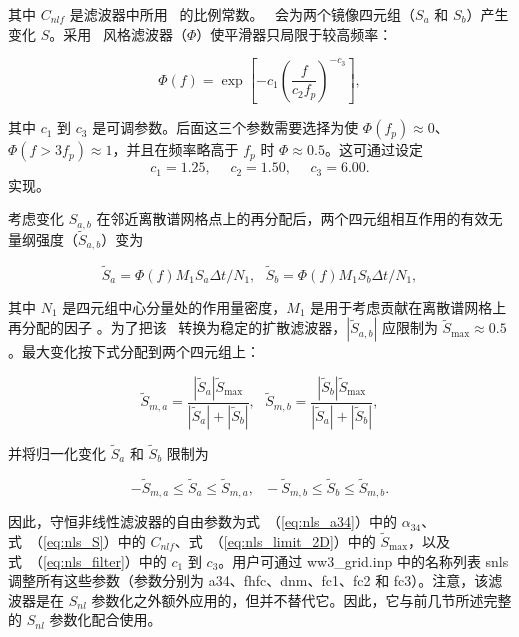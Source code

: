 \noindent 
其中 $C_{nlf}$ 是滤波器中所用 \dia\ 的比例常数。 \dia\ 会为两个镜像四元组（$S_a$ 和 $S_b$）产生变化 $S$。采用 \js\ 风格滤波器（$\Phi$）使平滑器只局限于较高频率：


\begin{equation}
\Phi(f) = \exp \left [ -c_1 \left ( \frac{f}{c_2 f_p} \right ) ^ {-c_3}
               \right ] ,
\label{eq:nls_filter}
\end{equation}

\noindent
其中 $c_1$ 到 $c_3$ 是可调参数。后面这三个参数需要选择为使 $\Phi(f_p) \approx 0$、$\Phi(f > 3f_p) \approx 1$，并且在频率略高于 $f_p$ 时 $\Phi \approx 0.5$。这可通过设定
\begin{equation}
c_1 = 1.25, \:\:\:  \:\:\: c_2 = 1.50, \:\:\:  \:\:\: c_3 = 6.00. 
\label{eq:nls_f_parms}
\end{equation}
实现。

 
考虑变化 $S_{a,b}$ 在邻近离散谱网格点上的再分配后，两个四元组相互作用的有效无量纲强度（$\tilde{S}_{a,b}$）变为

\begin{equation}
\tilde{S}_a = \Phi(f) M_1 S_a \Delta t / N_1
, \:\:\:
\tilde{S}_b = \Phi(f) M_1 S_b \Delta t / N_1
, \label{eq:nls_tilde_s}
\end{equation}

\noindent 
其中 $N_1$ 是四元组中心分量处的作用量密度，$M_1$ 是用于考虑贡献在离散谱网格上再分配的因子 \citep[详见][]{tol:OMOD11}。为了把该 \dia\ 转换为稳定的扩散滤波器，$|\tilde{S}_{a,b}|$ 应限制为 $\tilde{S}_{\max} \approx 0.5$ \citep[例如][]{bk:Fle88}。最大变化按下式分配到两个四元组上：

\begin{equation}
\tilde{S}_{m,a} = 
   \frac{|\tilde{S}_a|\tilde{S}_{\max}}{|\tilde{S}_a|+|\tilde{S}_b|}
 , \:\:\:
\tilde{S}_{m,b} = 
   \frac{|\tilde{S}_b|\tilde{S}_{\max}}{|\tilde{S}_a|+|\tilde{S}_b|}
 ,
\label{eq:nls_limit_2D}
\end{equation}

\noindent
并将归一化变化 $\tilde{S}_a$ 和 $\tilde{S}_b$ 限制为

\begin{equation}
- \tilde{S}_{m,a} \leq \tilde{S}_a \leq \tilde{S}_{m,a}, \:\:\:
- \tilde{S}_{m,b} \leq \tilde{S}_b \leq \tilde{S}_{m,b}.
\label{eq:nls_limit}
\end{equation}

\noindent 
因此，守恒非线性滤波器的自由参数为式~（\ref{eq:nls_a34}）中的 $\alpha_{34}$、式~（\ref{eq:nls_S}）中的 $C_{nlf}$、式~（\ref{eq:nls_limit_2D}）中的 $\tilde{S}_{\max}$，以及式~（\ref{eq:nls_filter}）中的 $c_1$ 到 $c_3$。用户可通过 {\file ww3\_grid.inp} 中的名称列表 {\F snls} 调整所有这些参数（参数分别为 {\F a34}、{\F fhfc}、{\F dnm}、{\F fc1}、{\F fc2} 和 {\F fc3}）。注意，该滤波器是在 $S_{nl}$ 参数化之外额外应用的，但并不替代它。因此，它与前几节所述完整的 $S_{nl}$ 参数化配合使用。
